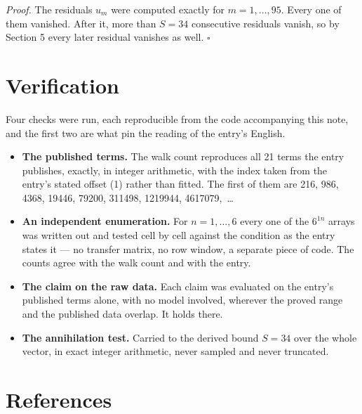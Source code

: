 \documentclass[11pt]{article}
\theoremstyle{definition}
\begin{document}
{\itshape Proof.} The residuals $u_m$ were computed exactly for $m = 1,\dots,95$. Every one of them vanished. After it, more than $S = 34$ consecutive residuals vanish, so by Section 5 every later residual vanishes as well. $\square$

\section{Verification}

Four checks were run, each reproducible from the code accompanying this note, and the first two are what pin the reading of the entry's English.

\begin{itemize}

\item {\bfseries The published terms.} The walk count reproduces all 21 terms the entry publishes, exactly, in integer arithmetic, with the index taken from the entry's stated offset (1) rather than fitted. The first of them are 216, 986, 4368, 19446, 79200, 311498, 1219944, 4617079,~\dots

\item {\bfseries An independent enumeration.} For $n = 1,\dots,6$ every one of the $6^{1n}$ arrays was written out and tested cell by cell against the condition as the entry states it --- no transfer matrix, no row window, a separate piece of code. The counts agree with the walk count and with the entry.

\item {\bfseries The claim on the raw data.} Each claim was evaluated on the entry's published terms alone, with no model involved, wherever the proved range and the published data overlap. It holds there.

\item {\bfseries The annihilation test.} Carried to the derived bound $S = 34$ over the whole vector, in exact integer arithmetic, never sampled and never truncated.

\end{itemize}

\section{References}
\end{document}
